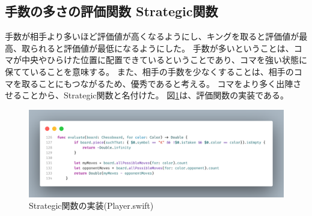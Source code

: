 \documentclass[12pt, a4paper, uplatex]{jsarticle}
\begin{document}
\subsection{手数の多さの評価関数 Strategic関数}
手数が相手より多いほど評価値が高くなるようにし、キングを取ると評価値が最高、取られると評価値が最低になるようにした。
手数が多いということは、コマが中央やひらけた位置に配置できているということであり、コマを強い状態に保てていることを意味する。
また、相手の手数を少なくすることは、相手のコマを取ることにもつながるため、優秀であると考える。
コマをより多く出陣させることから、Strategic関数と名付けた。
図\ref{fig:strategic}は、評価関数の実装である。
\begin{figure}
  [h]
  \centering
  \includegraphics[width=\textwidth]{StrategicEvaluator.png}
  \caption{Strategic関数の実装(Player.swift)}\label{fig:strategic}
\end{figure}
\end{document}
